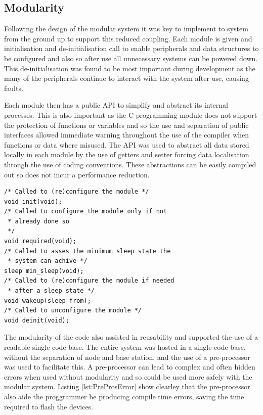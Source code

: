 \subsection{Modularity}
Following the design of the modular system it was key to implement to system from the ground up
to support this reduced coupling. Each module is given and initialisation and de-initialisation call to
enable peripherals and data structures to be configured and also so after use all unnecessary
systems can be powered down. This de-initialisation was found to be most important during
development as the many of the peripherals continue to interact with the system after use, causing
faults.

Each module then has a public \ac{API} to simplify and abstract its internal processes. This is also
important as the C programming module does not support the protection of functions or variables
and so the use and separation of public interfaces allowed immediate warning throughout the use of
the compiler when functions or data where misused. The \ac{API} was used to abstract all data stored
locally in each module by the use of getters and setter forcing data localisation through the use of
coding conventions. These abstractions can be easily compiled out so does not incur a performance
reduction.

\clearpage
\clearpage
{}
\begin{lstlisting}
/* Called to (re)configure the module */
void init(void);
/* Called to configure the module only if not
 * already done so
 */
void required(void);
/* Called to asses the minimum sleep state the
 * system can achive */
sleep min_sleep(void);
/* Called to (re)configure the module if needed
 * after a sleep state */
void wakeup(sleep from);
/* Called to unconfigure the module */
void deinit(void);
\end{lstlisting}


The modularity of the code also assisted in reusability and supported the use of a readable single
code base. The entire system was hosted in a single code base, without the separation of node and
base station, and the use of a pre-processor was used to facilitate this. A pre-processor can lead to complex
and often hidden errors when used without modularity and so could be used more safely with the
modular system. Listing \ref{lst:PreProsError} show clearley that the pre-processor also aide the proggrammer
be producing compile time errors, saving the time required to flash the devices.

